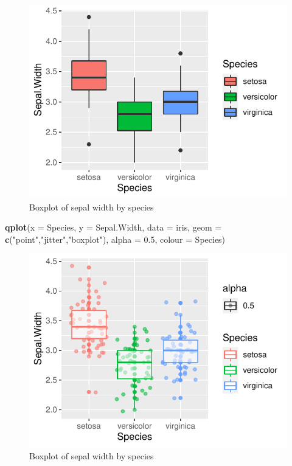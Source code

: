 \documentclass[]{article}
\newenvironment{Shaded}{\begin{snugshade}}{\end{snugshade}}
\newcommand{\DataTypeTok}[1]{\textcolor[rgb]{0.13,0.29,0.53}{#1}}
\newcommand{\FloatTok}[1]{\textcolor[rgb]{0.00,0.00,0.81}{#1}}
\newcommand{\KeywordTok}[1]{\textcolor[rgb]{0.13,0.29,0.53}{\textbf{#1}}}
\newcommand{\NormalTok}[1]{#1}
\newcommand{\StringTok}[1]{\textcolor[rgb]{0.31,0.60,0.02}{#1}}
\begin{document}
\begin{figure}
\centering
\includegraphics{Week3Answers_files/figure-latex/unnamed-chunk-10-1.pdf}
\caption{Boxplot of sepal width by species}
\end{figure}

\newpage

\begin{Shaded}
\begin{Highlighting}[]
\KeywordTok{qplot}\NormalTok{(}\DataTypeTok{x =}\NormalTok{ Species, }\DataTypeTok{y =}\NormalTok{ Sepal.Width, }\DataTypeTok{data =}\NormalTok{ iris, }\DataTypeTok{geom =} \KeywordTok{c}\NormalTok{(}\StringTok{"point"}\NormalTok{,}\StringTok{"jitter"}\NormalTok{,}\StringTok{"boxplot"}\NormalTok{), }
      \DataTypeTok{alpha =} \FloatTok{0.5}\NormalTok{, }\DataTypeTok{colour =}\NormalTok{ Species)}
\end{Highlighting}
\end{Shaded}

\begin{figure}
\centering
\includegraphics{Week3Answers_files/figure-latex/unnamed-chunk-11-1.pdf}
\caption{Boxplot of sepal width by species}
\end{figure}
\end{document}
